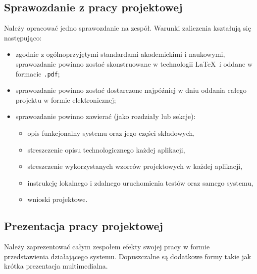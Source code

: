 \documentclass{article}
\begin{document}
	\subsection{Sprawozdanie z pracy projektowej}
	Należy opracować jedno sprawozdanie na zespół. Warunki zaliczenia kształują się następująco:
	\begin{itemize}
		\item zgodnie z ogólnoprzyjętymi standardami akademickimi i naukowymi, sprawozdanie powinno zostać skonstruowane w technologii \LaTeX \ i oddane w formacie \texttt{.pdf};
		\item sprawozdanie powinno zostać dostarczone najpóźniej w dniu oddania całego projektu w formie elektronicznej;
		\item sprawozdanie powinno zawierać (jako rozdziały lub sekcje):
		\begin{itemize}
			\item opis funkcjonalny systemu oraz jego części składowych,
			\item streszczenie opisu technologicznego każdej aplikacji,
			\item streszczenie wykorzystanych wzorców projektowych w każdej aplikacji,
			\item instrukcję lokalnego i zdalnego uruchomienia testów oraz samego systemu,
			\item wnioski projektowe.
		\end{itemize}
	\end{itemize}	
	
	\subsection{Prezentacja pracy projektowej}
	Należy zaprezentować całym zespołem efekty swojej pracy w formie przedstawienia działającego systemu. Dopuszczalne są dodatkowe formy takie jak krótka prezentacja multimedialna.
	
\end{document}
